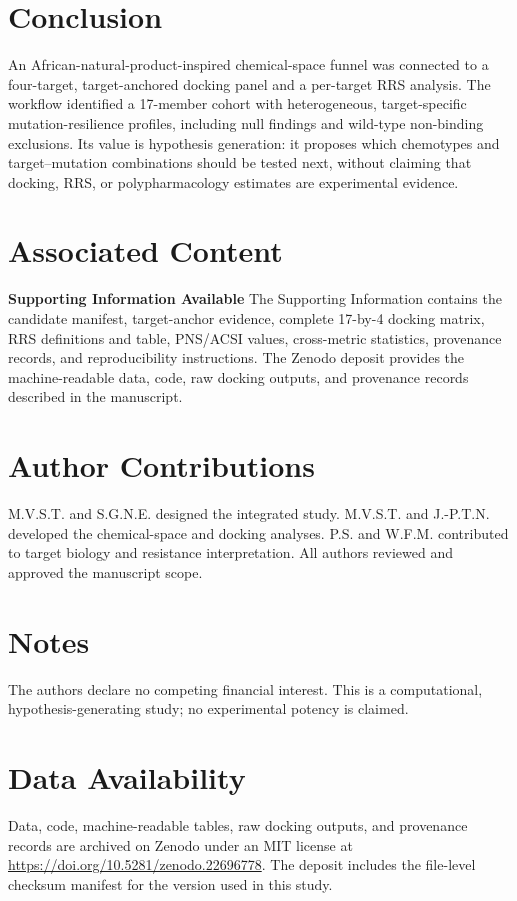 \documentclass[journal=jcisd8,manuscript=article]{achemso}
\begin{document}
\section{Conclusion}\label{sec:conclusion}
An African-natural-product-inspired chemical-space funnel was connected to a four-target, target-anchored docking panel and a per-target RRS analysis. The workflow identified a 17-member cohort with heterogeneous, target-specific mutation-resilience profiles, including null findings and wild-type non-binding exclusions. Its value is hypothesis generation: it proposes which chemotypes and target--mutation combinations should be tested next, without claiming that docking, RRS, or polypharmacology estimates are experimental evidence.

\section*{Associated Content}
\textbf{Supporting Information Available}
The Supporting Information contains the candidate manifest, target-anchor evidence, complete 17-by-4 docking matrix, RRS definitions and table, PNS/ACSI values, cross-metric statistics, provenance records, and reproducibility instructions. The Zenodo deposit provides the machine-readable data, code, raw docking outputs, and provenance records described in the manuscript.

\section*{Author Contributions}
M.V.S.T. and S.G.N.E. designed the integrated study. M.V.S.T. and J.-P.T.N. developed the chemical-space and docking analyses. P.S. and W.F.M. contributed to target biology and resistance interpretation. All authors reviewed and approved the manuscript scope.

\section*{Notes}
The authors declare no competing financial interest. This is a computational, hypothesis-generating study; no experimental potency is claimed.

\section*{Data Availability}
Data, code, machine-readable tables, raw docking outputs, and provenance records are archived on Zenodo under an MIT license at \url{https://doi.org/10.5281/zenodo.22696778}. The deposit includes the file-level checksum manifest for the version used in this study.
\end{document}
